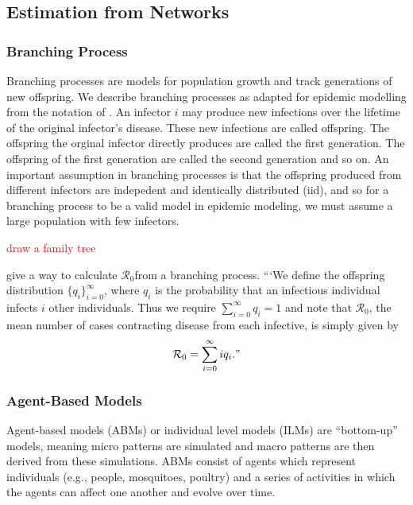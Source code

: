 \documentclass[12pt]{article}
\newcommand{\com}[1]{\textcolor{red}{ #1}}
\newcommand{\rr}{\ensuremath{\mathcal{R}_0}}
\begin{document}
\subsection{Estimation from Networks}
\label{sec:network}

\subsubsection{Branching Process}
\label{sec:branching-process}

Branching processes are models for population growth and track generations of new offspring.  We describe branching processes as adapted for epidemic modelling from the notation of \cite{grimmett1991}.  An infector $i$ may produce new infections over the lifetime of the original infector's disease.  These new infections are called offspring.  The offspring the orginal infector directly produces are called the first generation.  The offspring of the first generation are called the second generation and so on.  An important assumption in branching processes is that the offspring produced from different infectors are indepedent and identically distributed (iid), and so for a branching process to be a valid model in epidemic modeling, we must assume a large population with few infectors.

\com{draw a family tree}

\cite{getz2006} give a way to calculate \rr from a branching process.  ```We define the offspring distribution $\{q_i \}_{i=0}^\infty$, where $q_i$  is the probability that an infectious individual infects $i$ other individuals.  Thus we require $\sum_{i=0}^\infty q_i =1$ and note that $\rr$, the mean number of cases contracting disease from each infective, is simply given by
  \begin{align*}
    \rr = \sum_{i=0}^\infty iq_i."
  \end{align*}



    

\subsubsection{Agent-Based Models}
\label{sec:agent-based-models}
Agent-based models (ABMs) or individual level models (ILMs) are ``bottom-up'' models, meaning micro patterns are simulated and macro patterns are then derived from these simulations.  ABMs consist of agents which represent individuals (e.g., people, mosquitoes, poultry) and a series of activities in which the agents can affect one another and evolve over time.
\end{document}
